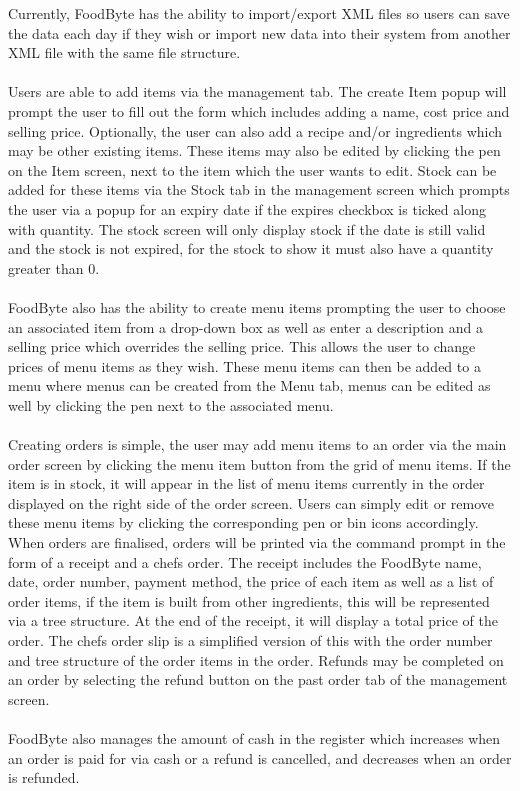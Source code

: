 Currently, FoodByte has the ability to import/export XML files so users can save the data each day if they wish or import new data into their system from another XML file with the same file structure. 
\\ \\
\noindent Users are able to add items via the management tab. The create Item popup will prompt the user to fill out the form which includes adding a name, cost price and selling price. Optionally, the user can also add a recipe and/or ingredients which may be other existing items. These items may also be edited by clicking the pen on the Item screen, next to the item which the user wants to edit. Stock can be added for these items via the Stock tab in the management screen which prompts the user via a popup for an expiry date if the expires checkbox is ticked along with quantity. The stock screen will only display stock if the date is still valid and the stock is not expired, for the stock to show it must also have a quantity greater than 0.
\\ \\
\noindent FoodByte also has the ability to create menu items prompting the user to choose an associated item from a drop-down box as well as enter a description and a selling price which overrides the selling price. This allows the user to change prices of menu items as they wish. These menu items can then be added to a menu where menus can be created from the Menu tab, menus can be edited as well by clicking the pen next to the associated menu.
\\ \\
\noindent Creating orders is simple, the user may add menu items to an order via the main order screen by clicking the menu item button from the grid of menu items. If the item is in stock, it will appear in the list of menu items currently in the order displayed on the right side of the order screen. Users can simply edit or remove these menu items by clicking the corresponding pen or bin icons accordingly. When orders are finalised, orders will be printed via the command prompt in the form of a receipt and a chefs order. The receipt includes the FoodByte name, date, order number, payment method, the price of each item as well as a list of order items, if the item is built from other ingredients, this will be represented via a tree structure. At the end of the receipt, it will display a total price of the order. The chefs order slip is a simplified version of this with the order number and tree structure of the order items in the order. Refunds may be completed on an order by selecting the refund button on the past order tab of the management screen.
\\ \\
\noindent FoodByte also manages the amount of cash in the register which increases when an order is paid for via cash or a refund is cancelled, and decreases when an order is refunded. 
